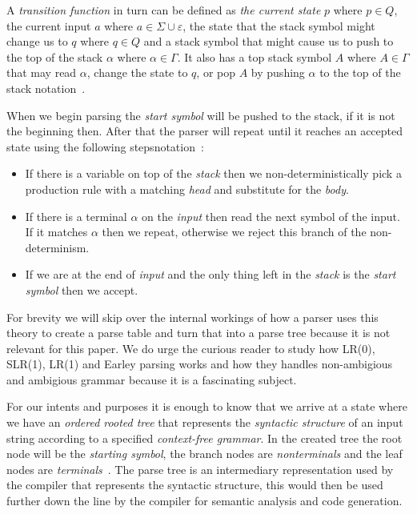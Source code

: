 \documentclass{sigchi}
\begin{document}
A \emph{transition function} in turn can be defined as \emph{the current state} $p$ where $p \in Q$, the current input $a$ where $a \in \Sigma \cup \varepsilon$, the state that the stack symbol might change us to $q$ where $q \in Q$ and a stack symbol that might cause us to push to the top of the stack $\alpha$ where $\alpha \in \Gamma$. It also has a top stack symbol $A$ where $A \in \Gamma$ that may read $\alpha$, change the state to $q$, or pop $A$ by pushing $\alpha$ to the top of the stack notation~\cite{Kozen:1997}.

When we begin parsing the \emph{start symbol} will be pushed to the stack, if it is not the beginning then. After that the parser will repeat until it reaches an accepted state using the following stepsnotation~\cite{Kozen:1997}:
\begin{itemize}
\item{If there is a variable on top of the \emph{stack} then we non-deterministically pick a production rule with a matching \emph{head} and substitute for the \emph{body}.}
\item{If there is a terminal $\alpha$ on the \emph{input} then read the next symbol of the input. If it matches $\alpha$ then we repeat, otherwise we reject this branch of the non-determinism.}
\item{If we are at the end of \emph{input} and the only thing left in the \emph{stack} is the \emph{start symbol} then we accept.}
\end{itemize}

For brevity we will skip over the internal workings of how a parser uses this theory to create a parse table and turn that into a parse tree because it is not relevant for this paper. We do urge the curious reader to study how LR(0), SLR(1), LR(1) and Earley parsing works and how they handles non-ambigious and ambigious grammar because it is a fascinating subject.

For our intents and purposes it is enough to know that we arrive at a state where we have an \emph{ordered rooted tree} that represents the \emph{syntactic structure} of an input string according to a specified \emph{context-free grammar}. In the created tree the root node will be the \emph{starting symbol}, the branch nodes are \emph{nonterminals} and the leaf nodes are \emph{terminals}~\cite{Kozen:1997}. The parse tree is an intermediary representation used by the compiler that represents the syntactic structure, this would then be used further down the line by the compiler for semantic analysis and code generation.
\end{document}
